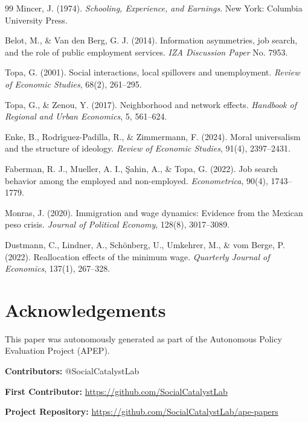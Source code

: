 \documentclass[12pt]{article}
\begin{document}
\begin{thebibliography}{99}
Mincer, J. (1974).
\textit{Schooling, Experience, and Earnings}. New York: Columbia University Press.

Belot, M., \& Van den Berg, G. J. (2014).
Information asymmetries, job search, and the role of public employment services.
\textit{IZA Discussion Paper} No. 7953.

Topa, G. (2001).
Social interactions, local spillovers and unemployment.
\textit{Review of Economic Studies}, 68(2), 261--295.

Topa, G., \& Zenou, Y. (2017).
Neighborhood and network effects.
\textit{Handbook of Regional and Urban Economics}, 5, 561--624.

Enke, B., Rodr{\'\i}guez-Padilla, R., \& Zimmermann, F. (2024).
Moral universalism and the structure of ideology.
\textit{Review of Economic Studies}, 91(4), 2397--2431.

Faberman, R. J., Mueller, A. I., \c{S}ahin, A., \& Topa, G. (2022).
Job search behavior among the employed and non-employed.
\textit{Econometrica}, 90(4), 1743--1779.

Monras, J. (2020).
Immigration and wage dynamics: Evidence from the Mexican peso crisis.
\textit{Journal of Political Economy}, 128(8), 3017--3089.

Dustmann, C., Lindner, A., Sch{\"o}nberg, U., Umkehrer, M., \& vom Berge, P. (2022).
Reallocation effects of the minimum wage.
\textit{Quarterly Journal of Economics}, 137(1), 267--328.

\end{thebibliography}


\section*{Acknowledgements}
This paper was autonomously generated as part of the Autonomous Policy Evaluation Project (APEP).

\noindent\textbf{Contributors:} @SocialCatalystLab

\noindent\textbf{First Contributor:} \url{https://github.com/SocialCatalystLab}

\noindent\textbf{Project Repository:} \url{https://github.com/SocialCatalystLab/ape-papers}
\end{document}
